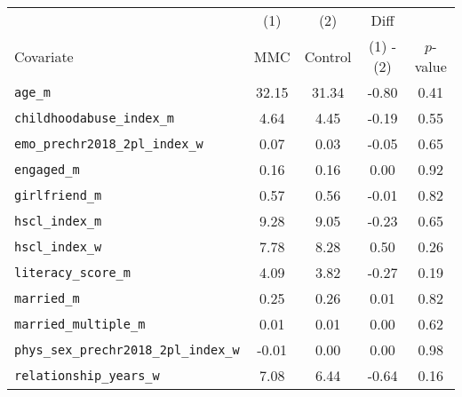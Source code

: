 \begin{table}[H]
\centering
\begin{tabular}{lcccc}
\toprule
\multicolumn{1}{c}{ } & \multicolumn{1}{c}{(1)} & \multicolumn{1}{c}{(2)} & \multicolumn{1}{c}{Diff} & \multicolumn{1}{c}{ } \\
Covariate & MMC & Control & (1) - (2) & $p$-value\\
\midrule
\texttt{age\_m} & 32.15 & 31.34 & -0.80 & 0.41\\
\texttt{childhoodabuse\_index\_m} & 4.64 & 4.45 & -0.19 & 0.55\\
\texttt{emo\_prechr2018\_2pl\_index\_w} & 0.07 & 0.03 & -0.05 & 0.65\\
\texttt{engaged\_m} & 0.16 & 0.16 & 0.00 & 0.92\\
\texttt{girlfriend\_m} & 0.57 & 0.56 & -0.01 & 0.82\\
\addlinespace
\texttt{hscl\_index\_m} & 9.28 & 9.05 & -0.23 & 0.65\\
\texttt{hscl\_index\_w} & 7.78 & 8.28 & 0.50 & 0.26\\
\texttt{literacy\_score\_m} & 4.09 & 3.82 & -0.27 & 0.19\\
\texttt{married\_m} & 0.25 & 0.26 & 0.01 & 0.82\\
\texttt{married\_multiple\_m} & 0.01 & 0.01 & 0.00 & 0.62\\
\addlinespace
\texttt{phys\_sex\_prechr2018\_2pl\_index\_w} & -0.01 & 0.00 & 0.00 & 0.98\\
\texttt{relationship\_years\_w} & 7.08 & 6.44 & -0.64 & 0.16\\
\bottomrule
\end{tabular}
\end{table}
